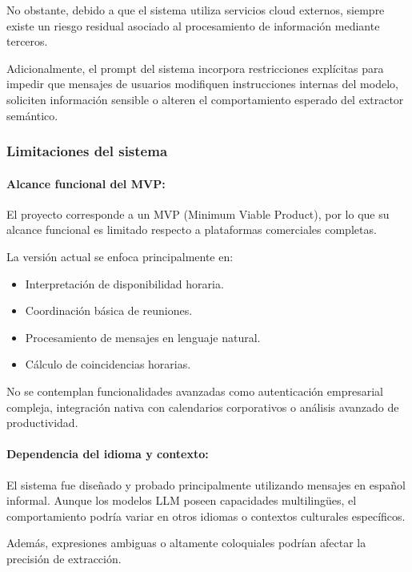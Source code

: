 No obstante, debido a que el sistema utiliza servicios cloud externos, siempre existe un riesgo residual asociado al procesamiento de información mediante terceros.

Adicionalmente, el prompt del sistema incorpora restricciones explícitas para impedir que mensajes de usuarios modifiquen instrucciones internas del modelo, soliciten información sensible o alteren el comportamiento esperado del extractor semántico.

\subsubsection{Limitaciones del sistema}

\paragraph{Alcance funcional del MVP:}

El proyecto corresponde a un MVP (Minimum Viable Product), por lo que su alcance funcional es limitado respecto a plataformas comerciales completas.

La versión actual se enfoca principalmente en:

\begin{itemize}
    \item Interpretación de disponibilidad horaria.
    \item Coordinación básica de reuniones.
    \item Procesamiento de mensajes en lenguaje natural.
    \item Cálculo de coincidencias horarias.
\end{itemize}

No se contemplan funcionalidades avanzadas como autenticación empresarial compleja, integración nativa con calendarios corporativos o análisis avanzado de productividad.

\paragraph{Dependencia del idioma y contexto:}

El sistema fue diseñado y probado principalmente utilizando mensajes en español informal. Aunque los modelos LLM poseen capacidades multilingües, el comportamiento podría variar en otros idiomas o contextos culturales específicos.

Además, expresiones ambiguas o altamente coloquiales podrían afectar la precisión de extracción.

